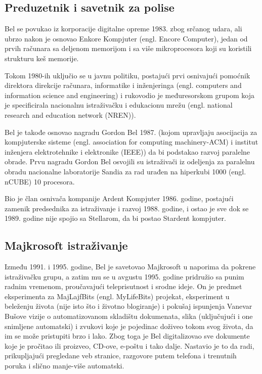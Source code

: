 \documentclass[a4paper]{article}
\begin{document}
{\subsection{Preduzetnik i savetnik za polise}
\label{subsec:podnaslov1}
Bel se povukao iz korporacije digitalne opreme 1983. zbog srčanog udara, ali ubrzo nakon je osnovao Enkore Kompjuter (engl. Encore Computer), jedan od prvih računara sa deljenom memorijom i sa više mikroprocesora koji su koristili strukturu keš memorije.

Tokom 1980-ih uključio se u javnu politiku, postajući prvi osnivajući pomoćnik direktora direkcije računara, informatike i inženjeringa (engl. computers and information science and engineering) i rukovodio je \-me\-đu\-re\-so\-rskom grupom koja je specificirala nacionalnu istraživačku i edukacionu mrežu (engl. national research and education network (NREN)).

Bel je takođe osnovao nagradu Gordon Bel 1987. (kojom upravljaju asocijacija za kompjuterske sisteme (engl. association for computing \-ma\-chi\-ne\-ry-ACM) i institut inženjera elektrotehnike i elektronike (IEEE)) da bi podstakao razvoj paralelne obrade. Prvu nagradu Gordon Bel osvojili su istraživači iz odeljenja za paralelnu obradu nacionalne laboratorije Sandia za rad urađen na hiperkubi 1000 (engl. nCUBE) 10 procesora.

Bio je član osnivača kompanije Ardent Kompjuter 1986. godine, postajući zamenik predsednika za istraživanje i razvoj 1988. godine, i ostao je sve dok se 1989. godine nije spojio sa Stellarom, da bi postao Stardent kompjuter.
\subsection{Majkrosoft istraživanje}
\label{subsec:podnaslov1}
Između 1991. i 1995. godine, Bel je savetovao Majkrosoft u naporima da pokrene istraživačku grupu, a zatim mu se u avgustu 1995. godine pridružio sa punim radnim vremenom, proučavajući teleprisutnost i srodne ideje. On je predmet eksperimenta za MajLajfBits (engl. MyLifeBits) projekat, eksperiment u beleženju života (nije isto što i životno blogiranje) i pokušaj ispunjenja Vanevar Bušove vizije o automatizovanom skladištu dokumenata, slika (uključujući i one snimljene automatski) i zvukovi koje je pojedinac doživeo tokom svog života, da im se može pristupiti brzo i lako. Zbog toga je Bel digitalizovao sve dokumente koje je pročitao ili proizveo, CD-ove, e-poštu i tako dalje. Nastavio je to da radi, prikupljajući pregledane veb stranice, razgovore putem telefona i trenutnih poruka i slično manje-više automatski.

}
\end{document}
